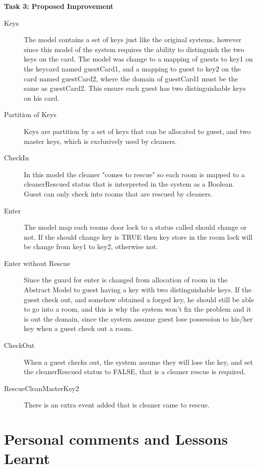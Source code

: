\documentclass[a4paper]{article}
\begin{document}
\noindent\textbf{Task 3: Proposed Improvement}
\begin{description}
\item [Keys] The model contains a set of keys just like the original systems, however since this model of the system requires the ability to distinguish the two keys on the card. The model was change to a mapping of guests to key1 on the keycard named guestCard1, and a mapping to guest to key2 on the card named guestCard2, where the domain of guestCard1 must be the same as guestCard2. This ensure each guest has two distinguishable keys on his card.
\item [Partition of Keys] Keys are partition by a set of keys that can be allocated to guest, and two master keys, which is exclusively used by cleaners.
\item [CheckIn] In this model the cleaner "comes to rescue" so each room is mapped to a cleanerRescued status that is interpreted in the system as a Boolean. Guest can only check into rooms that are rescued by cleaners.
\item [Enter] The model map each rooms door lock to a status called should change or not. If the should change key is TRUE then key store in the room lock will be change from key1 to key2, otherwise not.
\item [Enter without Rescue] Since the guard for enter is changed from allocation of room in the Abstract Model to guest having a key with two distinguishable keys. If the guest check out, and somehow obtained a forged key, he should still be able to go into a room, and this is why the system won't fix the problem and it is out the domain, since the system assume guest lose possession to his/her key when a guest check out a room.
\item[CheckOut] When a guest checks out, the system assume they will lose the key, and set the cleanerRescued status to FALSE, that is a cleaner rescue is required.
\item[RescueCleanMasterKey2] There is an extra event added that is cleaner came to rescue.
\end{description}

\section{Personal comments and Lessons Learnt}
\end{document}
